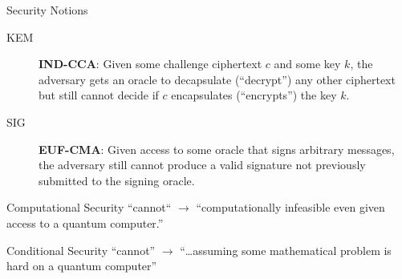 \documentclass[xcolor=table,10pt,aspectratio=169]{beamer}
\begin{document}
\begin{frame}[label={sec:org7653c16}]{Security Notions}
\begin{description}
\item[{KEM}] \textbf{IND-CCA}: Given some challenge ciphertext \(c\) and some key \(k\), the adversary gets an oracle to decapsulate (“decrypt”) any other ciphertext but still cannot decide if \(c\) encapsulates (“encrypts”) the key \(k\).

\item[{SIG}] \textbf{EUF-CMA}: Given access to some oracle that signs arbitrary messages, the adversary still cannot produce a valid signature not previously submitted to the signing oracle.
\end{description}

\pause

\begin{block}{Computational Security}
“cannot“ \(\rightarrow\) “computationally infeasible even given access to a quantum computer.”


\pause
\end{block}

\begin{block}{Conditional Security}
“cannot” \(\rightarrow\) “\ldots assuming some mathematical problem is hard on a quantum computer”
\end{block}
\end{frame}
\end{document}
